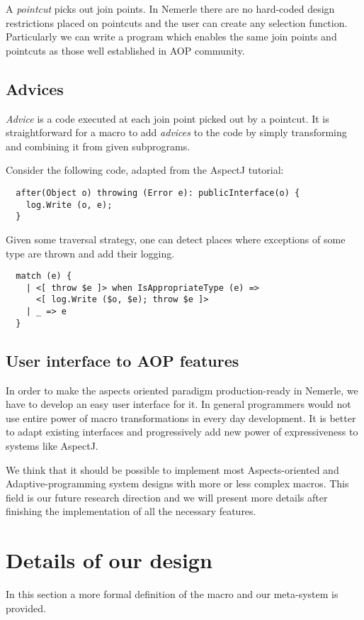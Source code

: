 \documentclass{llncs}
\begin{document}
A \emph{pointcut} picks out join points. In Nemerle there are no hard-coded 
design restrictions placed on pointcuts and the user can create any selection function.
Particularly we can write a program which enables the same join points and pointcuts 
as those well established in AOP community.

\subsection{Advices}
\emph{Advice} is a code executed at each join point picked out by a pointcut.
It is straightforward for a macro to add \emph{advices} to the code by simply transforming
and combining it from given subprograms.

Consider the following code, adapted from the AspectJ tutorial: 

\begin{verbatim}
  after(Object o) throwing (Error e): publicInterface(o) {
    log.Write (o, e);
  }
\end{verbatim}

Given some traversal strategy, one can detect places where exceptions of some
type are thrown and add their logging.

\begin{verbatim}
  match (e) {
    | <[ throw $e ]> when IsAppropriateType (e) =>
      <[ log.Write ($o, $e); throw $e ]>
    | _ => e
  }
\end{verbatim}

\subsection{User interface to AOP features}
In order to make the aspects oriented paradigm production-ready in Nemerle, we have
to develop an easy user interface for it. In general programmers would not use entire power
of macro transformations in every day development. It is better to adapt existing
interfaces and progressively add new power of expressiveness to systems like AspectJ.

We think that it should be possible to implement most Aspects-oriented
and Adaptive-programming system designs with more or less complex 
macros. This field is our future research direction and we will present
more details after finishing the implementation of all the necessary features.

\section{Details of our design}
In this section a more formal definition of the macro and our meta-system is provided.
\end{document}
